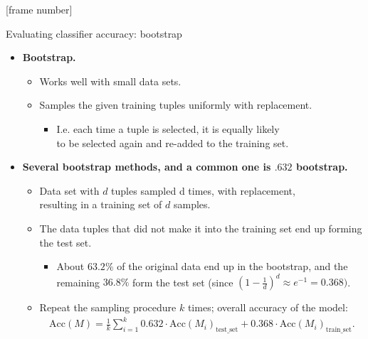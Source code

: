 \documentclass[aspectratio=169,t,table]{beamer}
\begin{document}
  {
    [frame number]
    \begin{frame}{Evaluating classifier accuracy: bootstrap}
      \begin{itemize}
        \item \textbf{Bootstrap.}
        \begin{itemize}
          \item Works well with small data sets.
          \item Samples the given training tuples uniformly with replacement.
          \begin{itemize}
            \item I.e. each time a tuple is selected, it is equally likely \\
            to be selected again and re-added to the training set.
          \end{itemize}
        \end{itemize}
        \item \textbf{Several bootstrap methods, and a common one is $.632$ bootstrap.}
        \begin{itemize}
          \item Data set with $d$ tuples sampled d times, with replacement, \\
          resulting in a training set of $d$ samples.
          \item The data tuples that did not make it into the training set end up forming the test set.
          \begin{itemize}
            \item About $63.2\%$ of the original data end up in the bootstrap, and the remaining $36.8\%$ form the test set (since $(1-\frac{1}{d})^d \approx e^{-1} = 0.368)$.
          \end{itemize}
          \item Repeat the sampling procedure $k$ times; overall accuracy of the model:
          \begin{align}
            \text{Acc}(M) = \frac{1}{k} \sum_{i=1}^{k} 0.632 \cdot \text{Acc}(M_i)_{\text{test\_set}} + 0.368 \cdot \text{Acc}(M_i)_{\text{train\_set}}.
          \end{align}
        \end{itemize}
      \end{itemize}
    \end{frame}
  }
\end{document}
